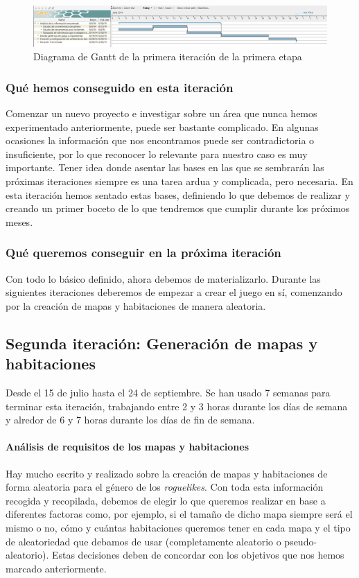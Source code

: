 \begin{figure}
    \includegraphics[width=\textwidth,height=\textheight,keepaspectratio]{./img/sec1it1.png}
  \caption{Diagrama de Gantt de la primera iteración de la primera etapa}
  \label{fig:sec1it1}
\end{figure}

\subsubsection{Qué hemos conseguido en esta iteración}

Comenzar un nuevo proyecto e investigar sobre un área que nunca hemos experimentado anteriormente, puede ser bastante complicado. En algunas ocasiones la información que nos encontramos puede ser contradictoria o insuficiente, por lo que reconocer lo relevante para nuestro caso es muy importante. Tener idea donde asentar las bases en las que se sembrarán las próximas iteraciones siempre es una tarea ardua y complicada, pero necesaria. En esta iteración hemos sentado estas bases, definiendo lo que debemos de realizar y creando un primer boceto de lo que tendremos que cumplir durante los próximos meses.

\subsubsection{Qué queremos conseguir en la próxima iteración}

Con todo lo básico definido, ahora debemos de materializarlo. Durante las siguientes iteraciones deberemos de empezar a crear el juego en sí, comenzando por la creación de mapas y habitaciones de manera aleatoria.

\subsection{Segunda iteración: Generación de mapas y habitaciones}

Desde el 15 de julio hasta el 24 de septiembre. Se han usado 7 semanas para terminar esta iteración, trabajando entre 2 y 3 horas durante los días de semana y alredor de 6 y 7 horas durante los días de fin de semana.

\paragraph{Análisis de requisitos de los mapas y habitaciones} Hay mucho escrito y realizado sobre la creación de mapas y habitaciones de forma aleatoria para el género de los \textit{roguelikes}. Con toda esta información recogida y recopilada, debemos de elegir lo que queremos realizar en base a diferentes factoras como, por ejemplo, si el tamaño de dicho mapa siempre será el mismo o no, cómo y cuántas habitaciones queremos tener en cada mapa y el tipo de aleatoriedad que debamos de usar (completamente aleatorio o pseudo-aleatorio). Estas decisiones deben de concordar con los objetivos que nos hemos marcado anteriormente.

